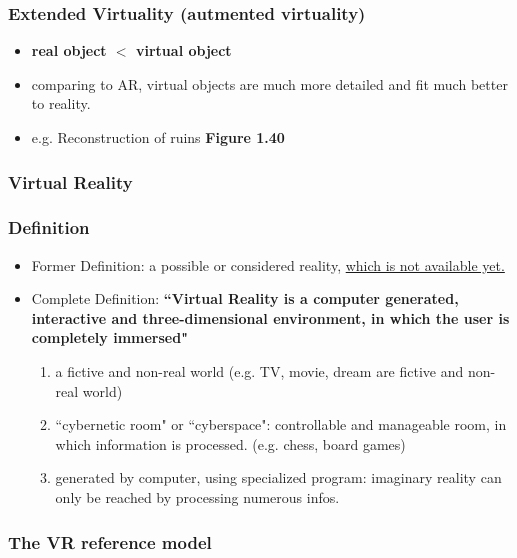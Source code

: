 \documentclass{standalone}
\begin{document}
\subsubsection{Extended Virtuality (autmented virtuality)}

\begin{itemize}
	\item \textbf{real object $<$ virtual object}
	\item comparing to AR, virtual objects are much more detailed and fit much better to reality.
	\item e.g. Reconstruction of ruins \textbf{Figure 1.40}
\end{itemize}

\subsubsection{Virtual Reality}

\subsubsection*{Definition}

\begin{itemize}
	\item Former Definition: a possible or considered reality, \underline{which is not available yet.}
	\item Complete Definition: \textbf{``Virtual Reality is a computer generated, interactive and three-dimensional environment, in which the user is completely immersed"}
		\begin{enumerate}
			\item a fictive and non-real world (e.g. TV, movie, dream are fictive and non-real world)
			\item ``cybernetic room" or ``cyberspace": controllable and manageable room, in which information is processed. (e.g. chess, board games)
			\item generated by computer, using specialized program: imaginary reality can only be reached by processing numerous infos. 
		\end{enumerate}
\end{itemize}

\subsubsection*{The VR reference model}
\end{document}
